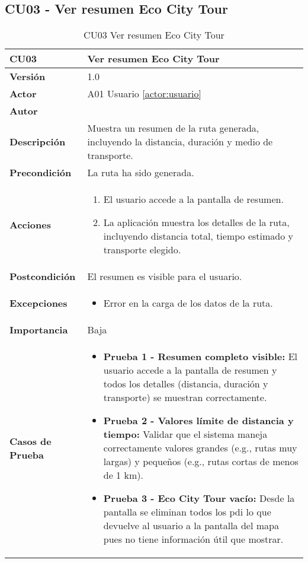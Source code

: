 \subsection{CU03 - Ver resumen Eco City Tour}
\begin{table}[H]
	\centering
	\begin{tabularx}{\linewidth}{ p{} p{} }
		\toprule
		\textbf{CU03}    & \textbf{Ver resumen Eco City Tour} \\
		\toprule
		\textbf{Versión}              & 1.0    \\
		\textbf{Actor}                & A01 Usuario \ref{actor:usuario} \\
		\textbf{Autor}                & \autor \\
		\textbf{Descripción}          & Muestra un resumen de la ruta generada, incluyendo la distancia, duración y medio de transporte. \\
		\textbf{Precondición}         & La ruta ha sido generada. \\
		\textbf{Acciones}             &
		\begin{enumerate}
			\def\labelenumi{\arabic{enumi}.}
			\tightlist
			\item El usuario accede a la pantalla de resumen.
			\item La aplicación muestra los detalles de la ruta, incluyendo distancia total, tiempo estimado y transporte elegido.
		\end{enumerate}\\
		\textbf{Postcondición}        & El resumen es visible para el usuario. \\
		\textbf{Excepciones}          & 
		\begin{itemize}
			\tightlist
			\item Error en la carga de los datos de la ruta.
		\end{itemize}\\
		\textbf{Importancia}          & Baja \\
		\textbf{Casos de Prueba}      &
		\begin{itemize}
			\item \textbf{Prueba 1 - Resumen completo visible:} El usuario accede a la pantalla de resumen y todos los detalles (distancia, duración y transporte) se muestran correctamente.
			\vspace{2pt}
			\item \textbf{Prueba 2 - Valores límite de distancia y tiempo:} Validar que el sistema maneja correctamente valores grandes (e.g., rutas muy largas) y pequeños (e.g., rutas cortas de menos de 1 km).
			\vspace{2pt}
			\item \textbf{Prueba 3 - Eco City Tour vacío:} Desde la pantalla se eliminan todos los \acrshort{pdi} lo que devuelve al usuario a la pantalla del mapa pues no tiene información útil que mostrar.
		\end{itemize} \\
		\bottomrule
	\end{tabularx}
	\caption{CU03 Ver resumen Eco City Tour}
	\label{cu:resumen}
\end{table}


